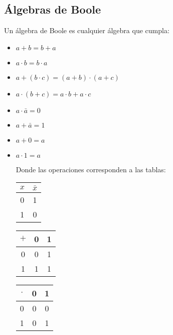 \documentclass[a4paper]{article}
\theoremstyle{plain} \newtheorem{PrimerPrincipio}{Teorema}
\theoremstyle{plain} \newtheorem{SegundoPrincipio}{Teorema}
\begin{document}
\subsection{Álgebras de Boole}
Un álgebra de Boole es cualquier álgebra que cumpla:
\begin{itemize}
\item $a+b=b+a$
\item $a\cdot b=b\cdot a$
\item $a+(b\cdot c)=(a+b)\cdot(a+c)$
\item $a\cdot(b+c)=a\cdot b+a\cdot c$
\item $a\cdot\bar{a}=0$
\item $a+\bar{a}=1$
\item $a+0=a$
\item $a\cdot 1=a$

Donde las operaciones corresponden a las tablas:
\begin{table}[H]
\begin{tabular}{|c|c|}
\hline
$x$ & $\bar{x}$ \\
\hline
0 & 1 \\
\hline
1 &  0\\
\hline
\end{tabular}
\end{table}
\begin{table}[H]
\begin{tabular}{|c|c|c|}
\hline
$+$ & 0 & 1 \\
\hline
0 & 0 & 1 \\
\hline
1 & 1 & 1 \\
\hline
\end{tabular}
\end{table}
\begin{table}[H]
\begin{tabular}{|c|c|c|}
\hline
$\cdot$ & 0 & 1 \\
\hline
0 & 0 & 0 \\
\hline
1 & 0 & 1 \\
\hline
\end{tabular}
\end{table}
\end{itemize}
\end{document}
